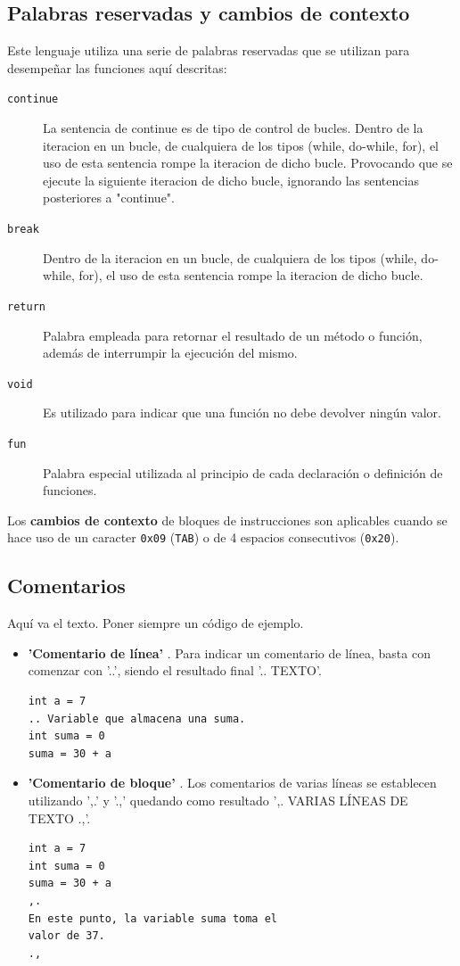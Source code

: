 \documentclass[11pt, english]{article}
\begin{document}
\subsection{Palabras reservadas y cambios de contexto}
Este lenguaje utiliza una serie de palabras reservadas que se utilizan para desempeñar las funciones aquí descritas:
\begin{description}
	\item[\texttt{continue}] La sentencia de continue es de tipo de control de bucles. Dentro de la iteracion en un bucle, de cualquiera de los tipos (while, do-while, for), el uso de esta sentencia rompe la iteracion de dicho bucle. Provocando que se ejecute la siguiente iteracion de dicho bucle, ignorando las sentencias posteriores a "continue".
	\item[\texttt{break}] Dentro de la iteracion en un bucle, de cualquiera de los tipos (while, do-while, for), el uso de esta sentencia rompe la iteracion de dicho bucle.
	\item[\texttt{return}] Palabra empleada para retornar el resultado de un método o función, además de interrumpir la ejecución del mismo.
	\item[\texttt{void}] Es utilizado para indicar que una función no debe devolver ningún valor.
	\item[\texttt{fun}] Palabra especial utilizada al principio de cada declaración o definición de funciones.
\end{description}

Los \textbf{cambios de contexto} de bloques de instrucciones son aplicables cuando se hace uso de un caracter \texttt{0x09} (\texttt{TAB}) o de 4 espacios consecutivos (\texttt{0x20}).

\subsection{Comentarios}
Aquí va el texto. Poner siempre un código de ejemplo.
\begin{itemize}
	\item \textbf{'Comentario de línea'} . Para indicar un comentario de línea, basta con comenzar con '..', siendo el resultado final '.. {TEXTO}'.
\begin{lstlisting}[caption=Ejemplo de comentario de línea]
int a = 7
.. Variable que almacena una suma.
int suma = 0
suma = 30 + a
\end{lstlisting}
	\item \textbf{'Comentario de bloque'} . Los comentarios de varias líneas se establecen utilizando ',.' y '.,'  quedando como resultado ',. {VARIAS LÍNEAS DE TEXTO} .,'.
\begin{lstlisting}[caption=Ejemplo de comentario de bloque]
int a = 7
int suma = 0
suma = 30 + a
,.
En este punto, la variable suma toma el
valor de 37.
.,
\end{lstlisting}
\end{itemize}
\end{document}
